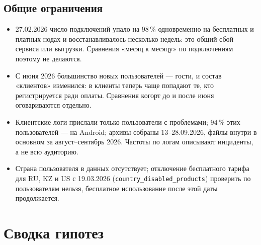 \documentclass[11pt,a4paper]{article}
\begin{document}
\subsection{Общие ограничения}
\begin{itemize}
  \item 27.02.2026 число подключений упало на 98\,\% одновременно на бесплатных и платных нодах и восстанавливалось несколько недель: это общий сбой сервиса или выгрузки. Сравнения «месяц к месяцу» по подключениям поэтому не делаются.
  \item С июня 2026 большинство новых пользователей --- гости, и состав «клиентов» изменился: в клиенты теперь чаще попадают те, кто регистрируется ради оплаты. Сравнения когорт до и после июня оговариваются отдельно.
  \item Клиентские логи прислали только пользователи с проблемами; 94\,\% этих пользователей --- на Android; архивы собраны 13--28.09.2026, файлы внутри в основном за август--сентябрь 2026. Частоты по логам описывают инциденты, а не всю аудиторию.
  \item Страна пользователя в данных отсутствует; отключение бесплатного тарифа для RU, KZ и US с 19.03.2026 (\texttt{country\_disabled\_products}) проверить по пользователям нельзя, бесплатное использование после этой даты продолжается.
\end{itemize}

\section{Сводка гипотез}
\end{document}
